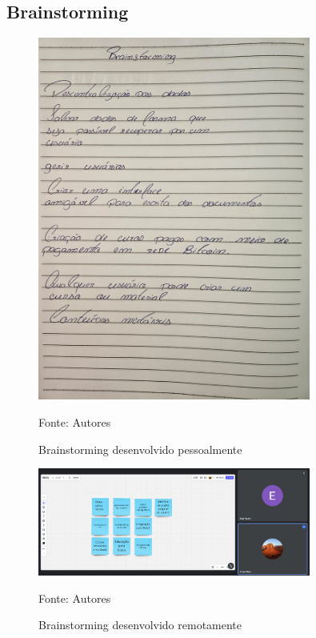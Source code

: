 \begin{apendicesenv}
\chapter{Brainstorming}
\label{cap:brainstorming}
    \begin{figure}[h]
        \centering
        \caption{Brainstorming desenvolvido pessoalmente}
        \includegraphics[width=0.8\textwidth]{figuras/brainstorming-presencial.png}
        \begin{center}
            {\footnotesize Fonte: Autores}
        \end{center}
        \label{fig:brainstorming-pessoal}
    \end{figure}

    \begin{figure}[h]
        \centering
        \caption{Brainstorming desenvolvido remotamente}
        \includegraphics[width=0.8\textwidth]{figuras/BrainsStorming online.png}
        \begin{center}
            {\footnotesize Fonte: Autores}
        \end{center}
        \label{fig:brainstorming-remoto}
    \end{figure}

\end{apendicesenv}

